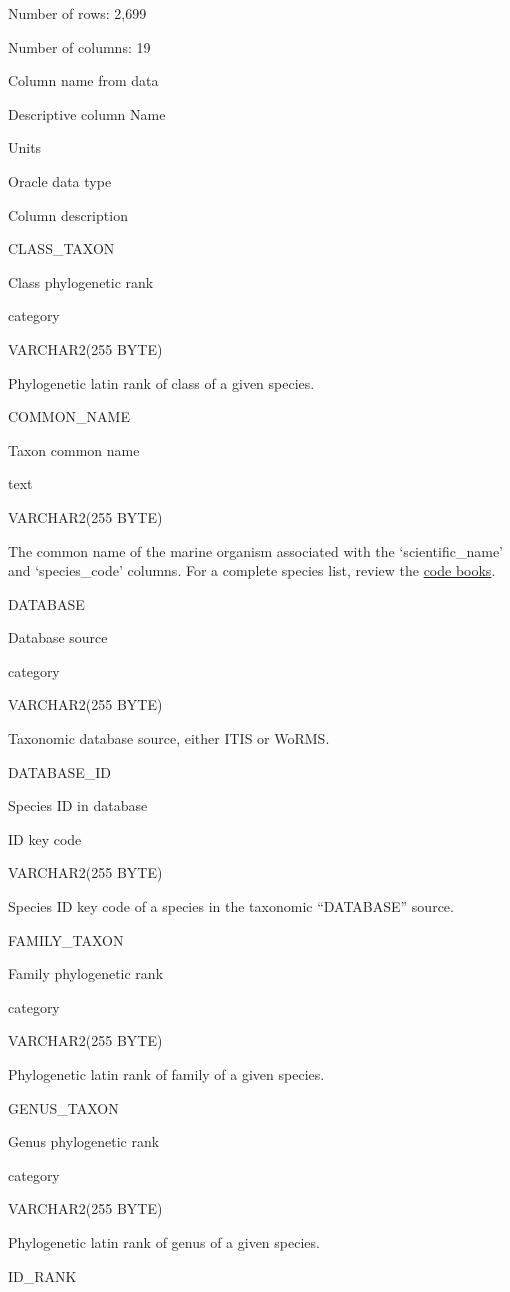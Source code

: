 \documentclass[
  letterpaper,
  oneside,
  open=any]{scrbook}
\begin{document}
Number of rows: 2,699

Number of columns: 19

Column name from data

Descriptive column Name

Units

Oracle data type

Column description

CLASS\_TAXON

Class phylogenetic rank

category

VARCHAR2(255 BYTE)

Phylogenetic latin rank of class of a given species.

COMMON\_NAME

Taxon common name

text

VARCHAR2(255 BYTE)

The common name of the marine organism associated with the
`scientific\_name' and `species\_code' columns. For a complete species
list, review the
\href{https://www.fisheries.noaa.gov/resource/document/groundfish-survey-species-code-manual-and-data-codes-manual}{code
books}.

DATABASE

Database source

category

VARCHAR2(255 BYTE)

Taxonomic database source, either ITIS or WoRMS.

DATABASE\_ID

Species ID in database

ID key code

VARCHAR2(255 BYTE)

Species ID key code of a species in the taxonomic ``DATABASE'' source.

FAMILY\_TAXON

Family phylogenetic rank

category

VARCHAR2(255 BYTE)

Phylogenetic latin rank of family of a given species.

GENUS\_TAXON

Genus phylogenetic rank

category

VARCHAR2(255 BYTE)

Phylogenetic latin rank of genus of a given species.

ID\_RANK
\end{document}
